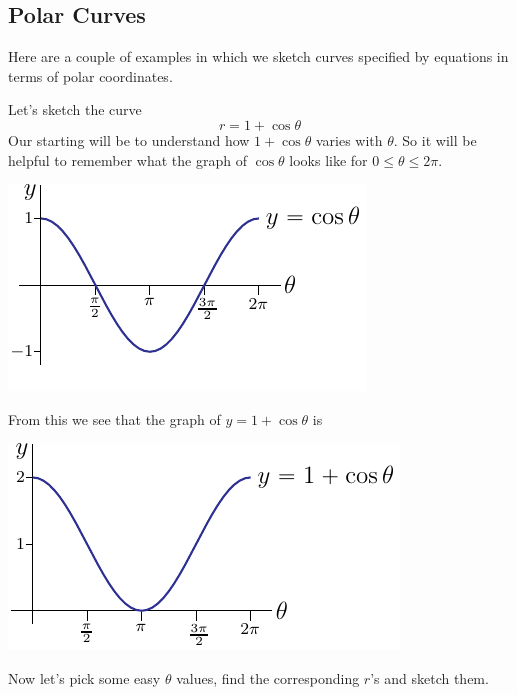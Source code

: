 \subsection{Polar Curves} \label{sec polar curves}

Here are a couple of examples in which we sketch curves specified 
by equations in terms of polar coordinates.

\begin{eg}\label{eg cardioid}
Let's sketch the curve 
\begin{equation*}
r= 1+\cos\theta
\end{equation*}
Our starting will be to understand how $1+\cos\theta$ varies with $\theta$.
So it will be helpful to 
remember what the graph of $\cos\theta$ looks like for $0\le\theta\le 2\pi$.
\begin{efig}
\begin{center}
    \includegraphics{cosGraph.pdf}
\end{center}
\end{efig}
From this we see that the graph of $y=1+\cos\theta$ is 
\begin{efig}
\begin{center}
    \includegraphics{cosGraphP1.pdf}
\end{center}
\end{efig}
Now let's pick some easy $\theta$ values, find the corresponding $r$'s
and sketch them.


\end{eg}
